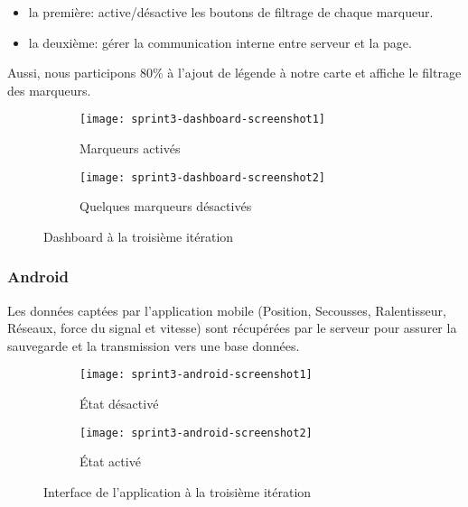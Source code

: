 \begin{itemize}
    \item la première: active/désactive les boutons de filtrage de chaque
        marqueur.
    \item la deuxième: gérer la communication interne entre serveur et la page.
\end{itemize}

Aussi, nous participons 80\% à l'ajout de légende à notre carte et affiche le
filtrage des marqueurs.

\begin{figure}[H]
\centering
    \begin{subfigure}{.7\textwidth}
    \centering
  \centering
  \texttt{[image: sprint3-dashboard-screenshot1]}
  \caption{Marqueurs activés}
\label{fig:sprint3-dashboard-screenshot1}
\end{subfigure}
\begin{subfigure}{.7\textwidth}
    \centering
  \centering
  \texttt{[image: sprint3-dashboard-screenshot2]}
  \caption{Quelques marqueurs désactivés}
\label{sprint3-dashboard-screenshot2}
\end{subfigure}
\caption{Dashboard  à la troisième itération}
\end{figure}

\subsubsection{Android}

Les données captées par l'application mobile (Position, Secousses,
Ralentisseur, Réseaux, force du signal et vitesse) sont récupérées par le
serveur pour assurer la sauvegarde et la transmission vers une base données.

\begin{figure}[H]
\centering
    \begin{subfigure}{.4\textwidth}
    \centering
  \centering
  \texttt{[image: sprint3-android-screenshot1]}
  \caption{État désactivé}
\label{fig:sprint3-android-screenshot1}
\end{subfigure}
\begin{subfigure}{.4\textwidth}
    \centering
  \centering
  \texttt{[image: sprint3-android-screenshot2]}
  \caption{État activé}
\label{fig:sprint3-android-screenshot2}
\end{subfigure}
\caption{Interface de l'application à la troisième itération}
\end{figure}

